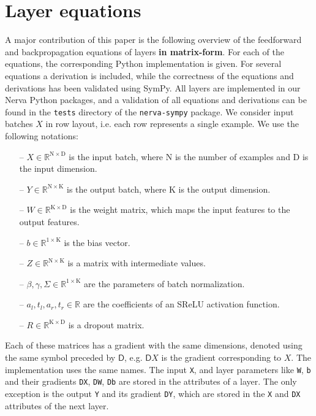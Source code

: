 \documentclass{article}
\newcommand{\const}[1]{\ensuremath{\mathrm{#1}}} %
\newcommand{\Gradient}{\textsf{D}}
\newcommand{\Reals}{\mathbb{R}}
\begin{document}
\section{Layer equations} \label{section:layers}
A major contribution of this paper is the following overview of the feedforward and backpropagation equations of layers \textbf{in matrix-form}. For each of the equations, the corresponding Python implementation is given. For several equations a derivation is included, while the correctness of the equations and derivations has been validated using SymPy. All layers are implemented in our Nerva Python packages, and a validation of all equations and derivations can be found in the \texttt{tests} directory of the \texttt{nerva-sympy} package. We consider input batches $X$ in row layout, i.e. each row represents a single example. We use the following notations:
\begin{enumerate}
    \item[--] $X \in \Reals^{\const{N} \times \const{D}}$ is the input batch, where $\const{N}$ is the number of examples and $\const{D}$ is the input dimension.
    \item[--] $Y \in \Reals^{\const{N} \times \const{K}}$ is the output batch, where $\const{K}$ is the output dimension.
    \item[--] $W \in \Reals^{\const{K} \times \const{D}}$ is the weight matrix, which maps the input features to the output features.
    \item[--] $b \in \Reals^{1 \times \const{K}}$ is the bias vector.
    \item[--] $Z \in \Reals^{\const{N} \times \const{K}}$ is a matrix with intermediate values.
    \item[--] $\beta, \gamma, \Sigma \in \Reals^{1 \times \const{K}}$ are the parameters of batch normalization.
    \item [--] $a_l, t_l, a_r, t_r \in \Reals$ are the coefficients of an SReLU activation function.
    \item[--] $R \in \Reals^{\const{K} \times \const{D}}$ is a dropout matrix.
\end{enumerate}
Each of these matrices has a gradient with the same dimensions, denoted using the same symbol preceded by $\Gradient{}$, e.g. $\Gradient{X}$ is the gradient corresponding to $X$. The implementation uses the same names. The input \texttt{X}, and layer parameters like \texttt{W}, \texttt{b} and their gradients \texttt{DX}, \texttt{DW}, \texttt{Db} are stored in the attributes of a layer. The only exception is the output \texttt{Y} and its gradient \texttt{DY}, which are stored in the \texttt{X} and \texttt{DX} attributes of the next layer.
\end{document}
